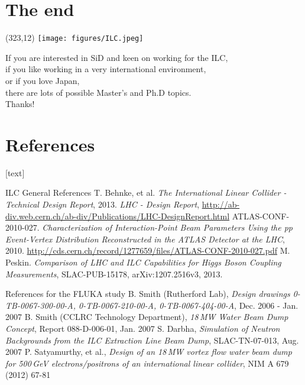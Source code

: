 \documentclass[xcolor={dvipsnames}]{beamer}
\newcommand{\ilclogo}{
  \setlength{\TPHorizModule}{1pt}
  \setlength{\TPVertModule}{1pt}
  \begin{textblock}{1}(323,12)
   \texttt{[image: figures/ILC.jpeg]}
  \end{textblock}
}
\begin{document}
\section*{The end}
{
\begin{frame}
\ilclogo
\begin{center}
If you are interested in SiD and keen on working for the ILC, \\
if you like working in a very international environment, \\
or if you love Japan,\\
there are lots of possible Master's and Ph.D topics.\\
\vspace*{1cm}
\textcolor{RubineRed}{
	\LARGE Thanks!
}
\end{center}
\end{frame}
}

\section*{References}
\begin{thebibliography}{9}
[text]
\begin{frame}{ILC General References}
 T. Behnke, et al.
\emph{The International Linear Collider - Technical Design Report}, 2013.
 \emph{LHC - Design Report}, \url{http://ab-div.web.cern.ch/ab-div/Publications/LHC-DesignReport.html}
 ATLAS-CONF-2010-027. \emph{Characterization of Interaction-Point Beam Parameters Using the pp Event-Vertex Distribution Reconstructed in the ATLAS Detector at the LHC}, 2010. \url{http://cds.cern.ch/record/1277659/files/ATLAS-CONF-2010-027.pdf}
 M. Peskin. \emph{Comparison of LHC and ILC Capabilities for Higgs Boson Coupling Measurements}, SLAC-PUB-15178, arXiv:1207.2516v3, 2013.
\end{frame}
\begin{frame}{References for the FLUKA study}
 B. Smith (Rutherford Lab), \emph{Design drawings 0-TB-0067-300-00-A, 0-TB-0067-210-00-A, 0-TB-0067-404-00-A}, Dec. 2006 - Jan. 2007
 B. Smith (CCLRC Technology Department), \emph{18\,MW Water Beam Dump Concept}, Report 088-D-006-01, Jan. 2007
 S. Darbha, \emph{Simulation of Neutron Backgrounds from the ILC Extraction Line Beam Dump}, SLAC-TN-07-013, Aug. 2007
 P. Satyamurthy, et al., \emph{Design of an 18\,MW vortex flow water beam dump for 500\,GeV electrons/positrons of an international linear collider}, NIM A 679 (2012) 67-81
\end{frame}
\end{thebibliography}
\end{document}
